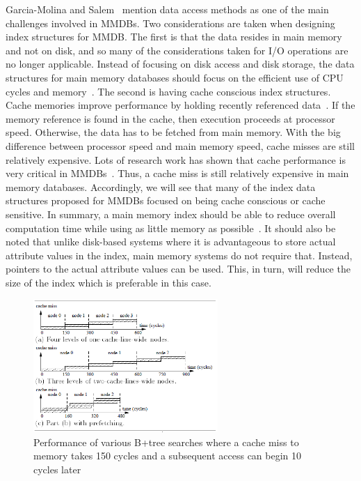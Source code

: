 \documentclass[12pt,a4paper]{article}
\begin{document}
Garcia-Molina and Salem~\cite{garcia1992main} mention data access methods as one of the main challenges involved in MMDBs. Two considerations are taken when
designing index structures for MMDB. The first is that the data resides in main memory and not on disk, and so many of the
considerations taken for I/O operations are no longer applicable. Instead of focusing on disk access and disk storage, the data structures for main memory
databases should focus on the efficient use of CPU cycles and memory~\cite{lehman1986study}. The second is having cache conscious index structures. Cache
memories improve performance by holding recently referenced data~\cite{smith1982cache}. If the memory reference is found in the cache, then execution proceeds
at processor speed. Otherwise, the data has to be fetched from main memory. With the big difference between processor speed and main memory speed, cache misses
are still relatively expensive. Lots of research work has shown that cache performance is very critical in MMDBs~\cite{boncz1999database,rao1999cache}. Thus, a
cache miss is still relatively expensive in main memory databases.
Accordingly, we will see that many of the index data structures proposed for MMDBs focused on being cache conscious or cache sensitive. In
summary, a main memory index should be able to reduce overall computation time while using as little memory as possible~\cite{lehman1986study}. It should also
be noted that unlike disk-based systems where it is advantageous to store actual attribute values in the index, main memory systems do not require that.
Instead, pointers to the actual attribute values can be used. This, in turn, will reduce the size of the index which is preferable in this case.

\begin{figure}[!t]
\centering
\includegraphics[width=7cm]{figs/prefetching.png}
\caption{Performance of various B+tree searches where a cache miss to memory takes 150 cycles and a subsequent access can begin 10 cycles
later~\cite{chen2001improving}}
\label{fig:prefetching}
\end{figure}
\end{document}
